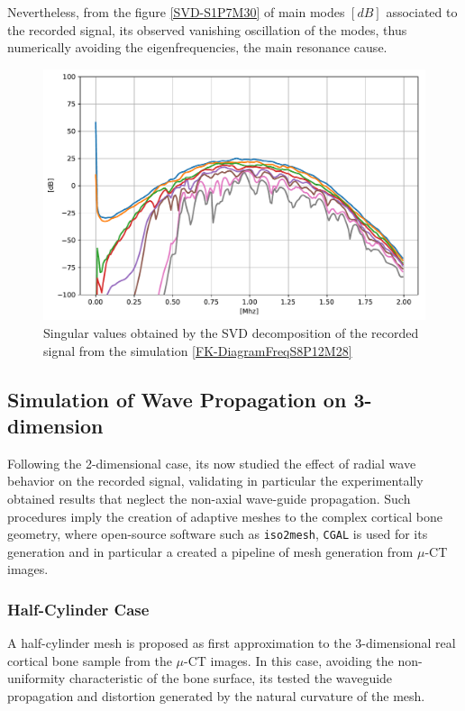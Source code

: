 Nevertheless, from the figure \ref{SVD-S1P7M30} of main modes $[dB]$ associated to the recorded signal, its observed vanishing oscillation of the modes, thus numerically avoiding the eigenfrequencies, the main resonance cause.
\begin{figure}[!h]
	\centering
	\includegraphics[scale=.5]{images/FreqMultSous/2D-FreqSimP12W28eKV_SV.pdf}
	\caption{Singular values obtained by the SVD decomposition of the recorded signal from the simulation \ref{FK-DiagramFreqS8P12M28}}
	\label{SVD-FreqS8P12M28}
\end{figure}


\subsection{Simulation of Wave Propagation on 3-dimension}
Following the 2-dimensional case, its now studied the effect of radial wave behavior on the recorded signal, validating in particular the experimentally obtained results that neglect the non-axial wave-guide propagation. 
Such procedures imply the creation of adaptive meshes to the complex cortical bone geometry, where open-source software such as \texttt{iso2mesh}, \texttt{CGAL} is used for its generation and in particular a created a pipeline of mesh generation from $\mu$-CT images.

\subsubsection{Half-Cylinder Case}
A half-cylinder mesh is proposed as first approximation to the 3-dimensional real cortical bone sample from the $\mu$-CT images. In this case, avoiding the non-uniformity characteristic of the bone surface, its tested the waveguide propagation and distortion generated by the natural curvature of the mesh.


